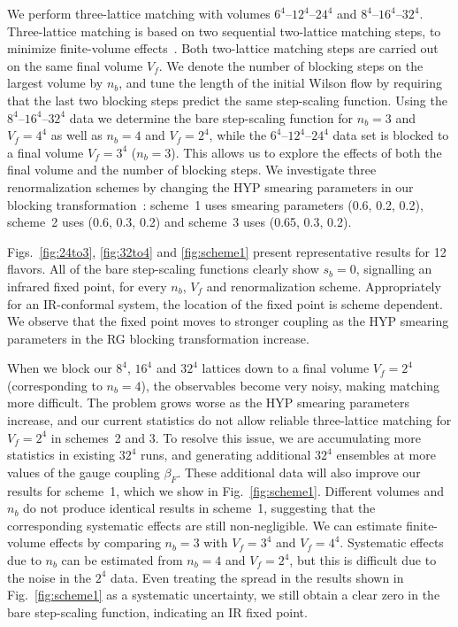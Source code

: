\documentclass{PoS}
\newcommand{\be}{\ensuremath{\beta} }
\newcommand{\fig}[1]{Fig.~\ref{#1}}
\begin{document}
We perform three-lattice matching with volumes $6^4$--$12^4$--$24^4$ and $8^4$--$16^4$--$32^4$.
Three-lattice matching is based on two sequential two-lattice matching steps, to minimize finite-volume effects~\cite{Hasenfratz:2011xn}.
Both two-lattice matching steps are carried out on the same final volume $V_f$.
We denote the number of blocking steps on the largest volume by $n_b$, and tune the length of the initial Wilson flow by requiring that the last two blocking steps predict the same step-scaling function.
Using the $8^4$--$16^4$--$32^4$ data we determine the bare step-scaling function for $n_b = 3$ and $V_f = 4^4$ as well as $n_b = 4$ and $V_f = 2^4$, while the $6^4$--$12^4$--$24^4$ data set is blocked to a final volume $V_f = 3^4$ ($n_b = 3$).
This allows us to explore the effects of both the final volume and the number of blocking steps.
We investigate three renormalization schemes by changing the HYP smearing parameters in our blocking transformation~\cite{Petropoulos:2012mg}: scheme~1 uses smearing parameters (0.6, 0.2, 0.2), scheme~2 uses (0.6, 0.3, 0.2) and scheme~3 uses (0.65, 0.3, 0.2).

Figs.~\ref{fig:24to3}, \ref{fig:32to4} and \ref{fig:scheme1} present representative results for 12 flavors.
All of the bare step-scaling functions clearly show $s_b = 0$, signalling an infrared fixed point, for every $n_b$, $V_f$ and renormalization scheme.
Appropriately for an IR-conformal system, the location of the fixed point is scheme dependent.
We observe that the fixed point moves to stronger coupling as the HYP smearing parameters in the RG blocking transformation increase.

When we block our $8^4$, $16^4$ and $32^4$ lattices down to a final volume $V_f = 2^4$ (corresponding to $n_b = 4$), the observables become very noisy, making matching more difficult.
The problem grows worse as the HYP smearing parameters increase, and our current statistics do not allow reliable three-lattice matching for $V_f = 2^4$ in schemes~2 and 3.
To resolve this issue, we are accumulating more statistics in existing $32^4$ runs, and generating additional $32^4$ ensembles at more values of the gauge coupling $\be_F$.
These additional data will also improve our results for scheme~1, which we show in \fig{fig:scheme1}.
Different volumes and $n_b$ do not produce identical results in scheme~1, suggesting that the corresponding systematic effects are still non-negligible.
We can estimate finite-volume effects by comparing $n_b = 3$ with $V_f = 3^4$ and $V_f = 4^4$.
Systematic effects due to $n_b$ can be estimated from $n_b = 4$ and $V_f = 2^4$, but this is difficult due to the noise in the $2^4$ data.
Even treating the spread in the results shown in \fig{fig:scheme1} as a systematic uncertainty, we still obtain a clear zero in the bare step-scaling function, indicating an IR fixed point.
\end{document}
